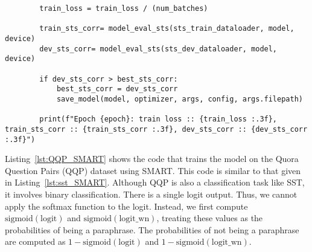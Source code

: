\begin{lstlisting}
        train_loss = train_loss / (num_batches)

        train_sts_corr= model_eval_sts(sts_train_dataloader, model, device)
        dev_sts_corr= model_eval_sts(sts_dev_dataloader, model, device)

        if dev_sts_corr > best_sts_corr:
            best_sts_corr = dev_sts_corr
            save_model(model, optimizer, args, config, args.filepath)

        print(f"Epoch {epoch}: train loss :: {train_loss :.3f}, train_sts_corr :: {train_sts_corr :.3f}, dev_sts_corr :: {dev_sts_corr :.3f}")

\end{lstlisting}

Listing~\ref{lst:QQP_SMART} shows the code that trains the model on the Quora Question Pairs (QQP) dataset using SMART. This code is similar to that given in Listing~\ref{lst:sst_SMART}. Although QQP is also a classification task like SST, it involves binary classification. There is a single logit output. Thus, we cannot apply the softmax function to the logit. Instead, we first compute $\text{sigmoid}(\mathrm{logit})$ and $\text{sigmoid}(\mathrm{logit\_wn})$, treating these values as the probabilities of being a paraphrase. The probabilities of not being a paraphrase are computed as $1 - \text{sigmoid}(\mathrm{logit})$ and $1 - \text{sigmoid}(\mathrm{logit\_wn})$.



